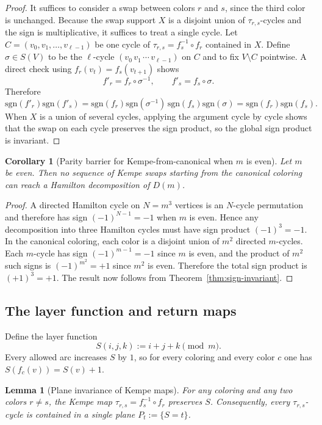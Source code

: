 \documentclass[11pt]{article}
\newtheorem{lemma}{Lemma}
\newtheorem{corollary}{Corollary}
\begin{document}
\begin{proof}
It suffices to consider a swap between colors $r$ and $s$, since the third color is unchanged.
Because the swap support $X$ is a disjoint union of $\tau_{r,s}$-cycles and the sign is multiplicative, it suffices to treat a single cycle.
Let $C=(v_0,v_1,\dots,v_{\ell-1})$ be one cycle of $\tau_{r,s}=f_s^{-1}\circ f_r$ contained in $X$.
Define $\sigma\in S(V)$ to be the $\ell$-cycle $(v_0\,v_1\,\cdots\,v_{\ell-1})$ on $C$ and to fix $V\setminus C$ pointwise.
A direct check using $f_r(v_t)=f_s(v_{t+1})$ shows
\[
f'_r=f_r\circ\sigma^{-1},\qquad f'_s=f_s\circ\sigma.
\]
Therefore
\[
\mathrm{sgn}(f'_r)\mathrm{sgn}(f'_s)
=
\mathrm{sgn}(f_r)\mathrm{sgn}(\sigma^{-1})\,\mathrm{sgn}(f_s)\mathrm{sgn}(\sigma)
=
\mathrm{sgn}(f_r)\mathrm{sgn}(f_s).
\]
When $X$ is a union of several cycles, applying the argument cycle by cycle shows that the swap on each cycle preserves the sign product, so the global sign product is invariant.
\end{proof}

\begin{corollary}[Parity barrier for Kempe-from-canonical when $m$ is even]\label{cor:parity-barrier}
Let $m$ be even. Then no sequence of Kempe swaps starting from the canonical coloring can reach a Hamilton decomposition of $D(m)$.
\end{corollary}

\begin{proof}
A directed Hamilton cycle on $N=m^3$ vertices is an $N$-cycle permutation and therefore has sign $(-1)^{N-1}=-1$ when $m$ is even.
Hence any decomposition into three Hamilton cycles must have sign product $(-1)^3=-1$.
In the canonical coloring, each color is a disjoint union of $m^2$ directed $m$-cycles.
Each $m$-cycle has sign $(-1)^{m-1}=-1$ since $m$ is even, and the product of $m^2$ such signs is $(-1)^{m^2}=+1$ since $m^2$ is even.
Therefore the total sign product is $(+1)^3=+1$.
The result now follows from Theorem~\ref{thm:sign-invariant}.
\end{proof}

\subsection{The layer function and return maps}
Define the layer function
\[
S(i,j,k):=i+j+k\pmod m.
\]
Every allowed arc increases $S$ by $1$, so for every coloring and every color $c$ one has $S(f_c(v))=S(v)+1$.

\begin{lemma}[Plane invariance of Kempe maps]\label{lem:plane-invariant}
For any coloring and any two colors $r\ne s$, the Kempe map $\tau_{r,s}=f_s^{-1}\circ f_r$ preserves $S$.
Consequently, every $\tau_{r,s}$-cycle is contained in a single plane $P_t:=\{S=t\}$.
\end{lemma}
\end{document}
